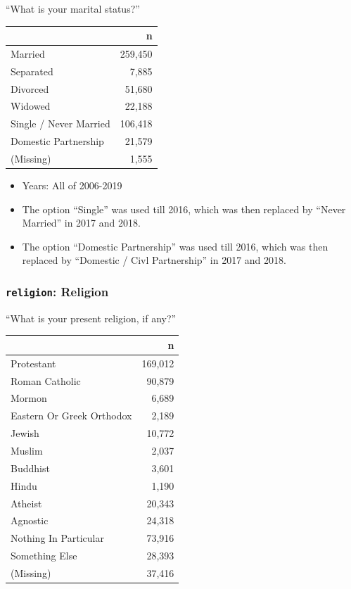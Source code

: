 \documentclass[10pt,article,oneside]{memoir}
\theoremstyle{definition}
\begin{document}
``What is your marital status?''

\begin{table}[H]
\centering
\begin{tabular}{lr}
\toprule
 & n\\
\midrule
Married & 259,450\\
Separated & 7,885\\
Divorced & 51,680\\
Widowed & 22,188\\
Single / Never Married & 106,418\\
Domestic Partnership & 21,579\\
(Missing) & 1,555\\
\bottomrule
\end{tabular}
\end{table}

\begin{itemize}
\tightlist
\item
  Years: All of 2006-2019
\item
  The option ``Single'' was used till 2016, which was then replaced by
  ``Never Married'' in 2017 and 2018.
\item
  The option ``Domestic Partnership'' was used till 2016, which was then
  replaced by ``Domestic / Civl Partnership'' in 2017 and 2018.
\end{itemize}

\hypertarget{religion-religion}{%
\subsubsection{\texorpdfstring{\texttt{religion}:
Religion}{religion: Religion}}\label{religion-religion}}

``What is your present religion, if any?''

\begin{table}[H]
\centering
\begin{tabular}{lr}
\toprule
 & n\\
\midrule
Protestant & 169,012\\
Roman Catholic & 90,879\\
Mormon & 6,689\\
Eastern Or Greek Orthodox & 2,189\\
Jewish & 10,772\\
Muslim & 2,037\\
Buddhist & 3,601\\
Hindu & 1,190\\
Atheist & 20,343\\
Agnostic & 24,318\\
Nothing In Particular & 73,916\\
Something Else & 28,393\\
(Missing) & 37,416\\
\bottomrule
\end{tabular}
\end{table}
\end{document}
